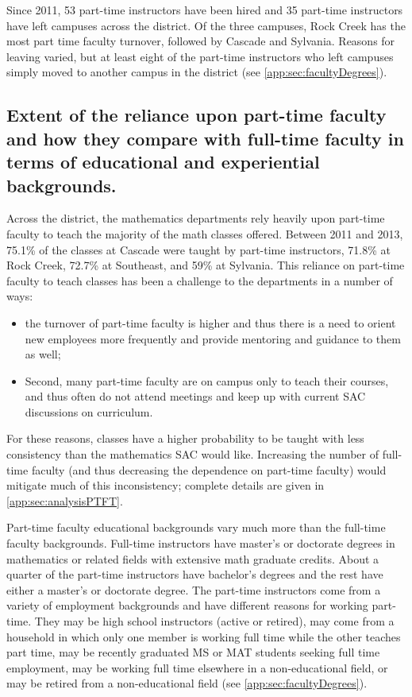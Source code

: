 Since 2011, 53 part-time instructors have been hired and 35 part-time
instructors have left campuses across the district.  Of the three campuses,
Rock Creek has the most part time faculty turnover, followed by Cascade and
Sylvania.  Reasons for leaving varied, but at least eight of the part-time
instructors who left campuses simply moved to another campus in the district
(see \vref{app:sec:facultyDegrees}).

\subsection{Extent of the reliance upon part-time faculty and how they compare
with full-time faculty in terms of educational and experiential backgrounds.}
Across the district, the mathematics departments rely heavily upon part-time
faculty to teach the majority of the math classes offered.  Between 2011 and
2013, 75.1\% of the classes at Cascade were taught by part-time instructors,
71.8\% at Rock Creek, 72.7\% at Southeast, and 59\% at Sylvania.  This reliance
on part-time faculty to teach classes has been a challenge to the departments
in a number of ways:  
\begin{itemize}
\item the turnover of part-time faculty is higher and
thus there is a need to orient new employees more frequently and provide
mentoring and guidance to them as well;
\item  Second, many part-time faculty are on
campus only to teach their courses, and thus often do not attend meetings and
keep up with current SAC discussions on curriculum.  
\end{itemize}
For these reasons, classes have a higher probability to be taught with less consistency than the
mathematics SAC would like.  Increasing the number of full-time faculty (and
thus decreasing the dependence on part-time faculty) would mitigate much of
this inconsistency; complete details are given in  \vref{app:sec:analysisPTFT}.

Part-time faculty educational backgrounds vary much more than the full-time
faculty backgrounds.  Full-time instructors have master's or doctorate degrees
in mathematics or related fields with extensive math graduate credits.  About a
quarter of the part-time instructors have bachelor's degrees and the rest have
either a master's or doctorate degree.  The part-time instructors come from a
variety of employment backgrounds and have different reasons for working
part-time.  They may be high school instructors (active or retired), may come
from a household in which only one member is working full time while the other
teaches part time, may be recently graduated MS or MAT students seeking full
time employment, may be working full time elsewhere in a non-educational field,
or may be retired from a non-educational field (see
\vref{app:sec:facultyDegrees}).

